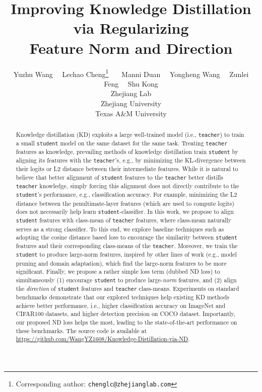 \documentclass{article}
\title{Improving Knowledge Distillation via Regularizing \\ 
Feature Norm and Direction}
\author{Yuzhu Wang~~
Lechao Cheng\thanks{Corresponding author: \texttt{chenglc@zhejianglab.com}}~~~
Manni Duan~~
Yongheng Wang~~
Zunlei Feng~~
Shu Kong\\
   Zhejiang Lab \\
   Zhejiang University \\
   Texas A\&M University 
}
\begin{document}
\maketitle








\begin{abstract}

Knowledge distillation (KD) exploits a large well-trained model (i.e., {\tt teacher}) to train a small {\tt student} model on the same dataset for the same task.
Treating {\tt teacher} features as knowledge, prevailing methods of knowledge distillation train {\tt student} by aligning its features with the {\tt teacher}'s, e.g., by minimizing the KL-divergence between their logits or L2 distance between their intermediate features. 
While it is natural to believe that better alignment of {\tt student} features to the {\tt teacher} better distills {\tt teacher} knowledge, simply forcing this alignment does not directly contribute to the {\tt student}'s performance, e.g., classification accuracy.
For example, minimizing the L2 distance between the penultimate-layer features (which are used to compute logits) does not necessarily help learn {\tt student}-classifier.
In this work, we propose to align {\tt student} features with class-mean of {\tt teacher} features, where class-mean naturally serves as a strong classifier.
To this end, we explore baseline techniques such as adopting the cosine distance based loss to encourage the similarity between {\tt student} features and their corresponding class-means of the {\tt teacher}.
Moreover, we train the {\tt student} to produce large-norm features, inspired by other lines of work (e.g., model pruning and domain adaptation), which find the large-norm features to be more significant.
Finally, we propose a rather simple loss term (dubbed ND loss) to simultaneously (1) encourage {\tt student} to produce large-\emph{norm} features, and (2) align the \emph{direction} of {\tt student} features and {\tt teacher} class-means. Experiments on standard benchmarks demonstrate that our explored techniques help existing KD methods achieve better performance, i.e., higher classification accuracy on ImageNet and CIFAR100 datasets, and higher detection precision on COCO dataset.
Importantly, our proposed ND loss helps the most, leading to the state-of-the-art performance on these benchmarks. The source code is available at \url{https://github.com/WangYZ1608/Knowledge-Distillation-via-ND}.









\end{abstract} 
\end{document}
